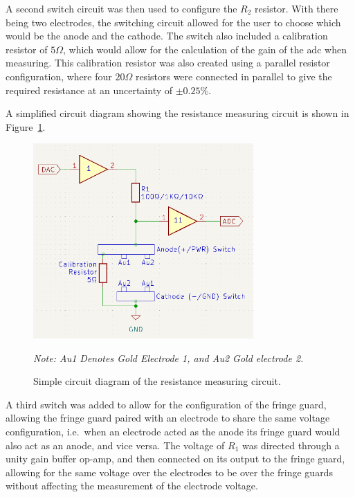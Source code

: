 A second switch circuit was then used to configure the $R_2$ resistor.
With there being two electrodes, the switching circuit allowed for the user to choose which would be the anode and the cathode.
The switch also included a calibration resistor of $5\Omega$, which would allow for the calculation of the gain of the \gls{adc} when measuring.
This calibration resistor was also created using a parallel resistor configuration, where four $20\Omega$ resistors were connected in parallel to give the required resistance at an uncertainty of $\pm0.25\%$.

A simplified circuit diagram showing the resistance measuring circuit is shown in Figure~\ref{fig:resistance_circuit}.

\begin{figure}[H]\label{fig:resistance_circuit}
    \centering
    \includegraphics[width=0.75\textwidth]{figures/fig_resistance_circuit.png}
    \caption{Simple circuit diagram of the resistance measuring circuit.}
    \textit{Note: Au1 Denotes Gold Electrode 1, and Au2 Gold electrode 2.}
    \label{fig:resistance_circuit}
\end{figure}

A third switch was added to allow for the configuration of the fringe guard, allowing the fringe guard paired with an electrode to share the same voltage configuration, i.e.~when an electrode acted as the anode its fringe guard would also act as an anode, and vice versa.
The voltage of $R_1$ was directed through a unity gain buffer op-amp, and then connected on its output to the fringe guard, allowing for the same voltage over the electrodes to be over the fringe guards without affecting the measurement of the electrode voltage.

